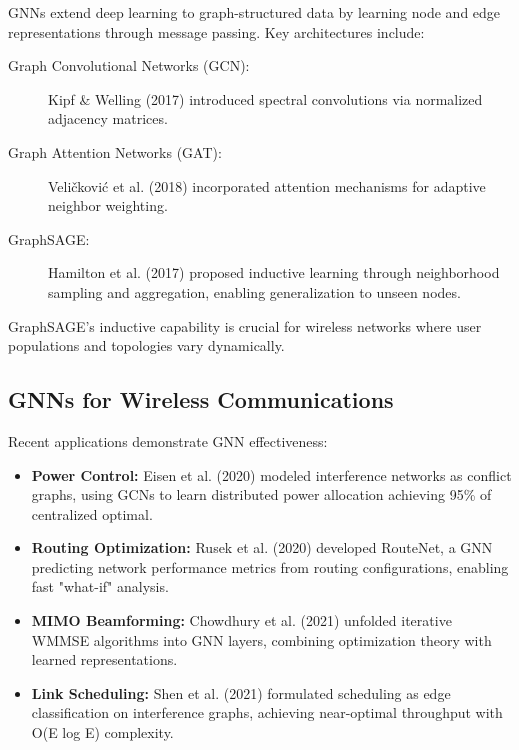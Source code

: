 GNNs extend deep learning to graph-structured data by learning node and edge representations through message passing. Key architectures include:

\begin{description}
    \item[Graph Convolutional Networks (GCN):] Kipf \& Welling (2017) introduced spectral convolutions via normalized adjacency matrices.
    
    \item[Graph Attention Networks (GAT):] Veličković et al. (2018) incorporated attention mechanisms for adaptive neighbor weighting.
    
    \item[GraphSAGE:] Hamilton et al. (2017) \cite{hamilton2017inductive} proposed inductive learning through neighborhood sampling and aggregation, enabling generalization to unseen nodes.
\end{description}

GraphSAGE's inductive capability is crucial for wireless networks where user populations and topologies vary dynamically.

\subsection{GNNs for Wireless Communications}

Recent applications demonstrate GNN effectiveness:

\begin{itemize}
    \item \textbf{Power Control:} Eisen et al. (2020) \cite{eisen2020optimal} modeled interference networks as conflict graphs, using GCNs to learn distributed power allocation achieving 95\% of centralized optimal.
    
    \item \textbf{Routing Optimization:} Rusek et al. (2020) \cite{rusek2020graph} developed RouteNet, a GNN predicting network performance metrics from routing configurations, enabling fast "what-if" analysis.
    
    \item \textbf{MIMO Beamforming:} Chowdhury et al. (2021) \cite{chowdhury2021unfolding} unfolded iterative WMMSE algorithms into GNN layers, combining optimization theory with learned representations.
    
    \item \textbf{Link Scheduling:} Shen et al. (2021) \cite{shen2021graph} formulated scheduling as edge classification on interference graphs, achieving near-optimal throughput with O(E log E) complexity.
\end{itemize}

